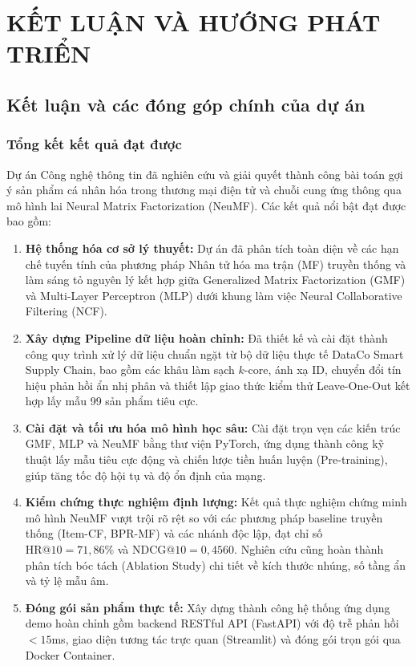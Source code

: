 \chapter{KẾT LUẬN VÀ HƯỚNG PHÁT TRIỂN}
\label{chap:ketluan}

\section{Kết luận và các đóng góp chính của dự án}
\label{sec:ketluan_donggop}

\subsection{Tổng kết kết quả đạt được}
\label{subsec:tongket_ketqua}

Dự án Công nghệ thông tin đã nghiên cứu và giải quyết thành công bài toán gợi ý sản phẩm cá nhân hóa trong thương mại điện tử và chuỗi cung ứng thông qua mô hình lai Neural Matrix Factorization (NeuMF). Các kết quả nổi bật đạt được bao gồm:

\begin{enumerate}
    \item \textbf{Hệ thống hóa cơ sở lý thuyết:} Dự án đã phân tích toàn diện về các hạn chế tuyến tính của phương pháp Nhân tử hóa ma trận (MF) truyền thống và làm sáng tỏ nguyên lý kết hợp giữa Generalized Matrix Factorization (GMF) và Multi-Layer Perceptron (MLP) dưới khung làm việc Neural Collaborative Filtering (NCF).
    
    \item \textbf{Xây dựng Pipeline dữ liệu hoàn chỉnh:} Đã thiết kế và cài đặt thành công quy trình xử lý dữ liệu chuẩn ngặt từ bộ dữ liệu thực tế DataCo Smart Supply Chain, bao gồm các khâu làm sạch $k$-core, ánh xạ ID, chuyển đổi tín hiệu phản hồi ẩn nhị phân và thiết lập giao thức kiểm thử Leave-One-Out kết hợp lấy mẫu 99 sản phẩm tiêu cực.
    
    \item \textbf{Cài đặt và tối ưu hóa mô hình học sâu:} Cài đặt trọn vẹn các kiến trúc GMF, MLP và NeuMF bằng thư viện PyTorch, ứng dụng thành công kỹ thuật lấy mẫu tiêu cực động và chiến lược tiền huấn luyện (Pre-training), giúp tăng tốc độ hội tụ và độ ổn định của mạng.
    
    \item \textbf{Kiểm chứng thực nghiệm định lượng:} Kết quả thực nghiệm chứng minh mô hình NeuMF vượt trội rõ rệt so với các phương pháp baseline truyền thống (Item-CF, BPR-MF) và các nhánh độc lập, đạt chỉ số $\text{HR@10} = 71{,}86\%$ và $\text{NDCG@10} = 0{,}4560$. Nghiên cứu cũng hoàn thành phân tích bóc tách (Ablation Study) chi tiết về kích thước nhúng, số tầng ẩn và tỷ lệ mẫu âm.
    
    \item \textbf{Đóng gói sản phẩm thực tế:} Xây dựng thành công hệ thống ứng dụng demo hoàn chỉnh gồm backend RESTful API (FastAPI) với độ trễ phản hồi $<15$ms, giao diện tương tác trực quan (Streamlit) và đóng gói trọn gói qua Docker Container.
\end{enumerate}

